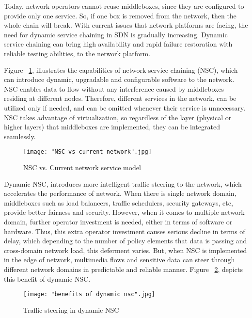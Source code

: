 \documentclass[english]{tktltiki2}
\theoremstyle{definition}
\theoremstyle{remark}
\begin{document}
{Today, network operators cannot reuse middleboxes, since they are configured to provide only one service. So, if one box is removed from the network, then the whole chain will break. With current issues that network platforms are facing,  the need for dynamic service chaining in SDN is gradually increasing. Dynamic service chaining can bring high availability and rapid failure restoration with reliable testing abilities, to the network platform. \cite{Wol13}

Figure ~\ref{fig:NSC}, illustrates the capabilities of network service chaining (NSC), which can introduce dynamic, upgradable and configurable software to the network. NSC enables data to flow without any interference caused by middleboxes residing at different nodes. Therefore, different services in the network, can be utilized only if needed, and can be omitted whenever their service is unnecessary. NSC takes advantage of virtualization, so regardless of the layer (physical or higher layers) that middleboxes are implemented, they can be integrated seamlessly. \cite{Wol13}
       
\begin{figure}[h!]
\centering
{}
\texttt{[image: "NSC vs current network".jpg]}
\caption{NSC vs. Current network service model \cite{Wol13}}
\label{fig:NSC}
\end{figure}

Dynamic NSC, introduces more intelligent traffic steering to the network, which accelerates the performance of network. When there is single network domain, middleboxes such as load balancers, traffic schedulers, security gateways, etc, provide better fairness and  security. However, when it comes to multiple network domain, further operator investment is needed, either in terms of software or hardware. Thus, this extra operator investment causes serious decline in terms of delay, which depending to the number of policy elements that data is passing and cross-domain network load, this deferment varies. But, when NSC is implemented in the edge of network, multimedia flows and sensitive data can steer through different network domains in predictable and reliable manner. Figure ~\ref{fig:NSCbenefit}, depicts this benefit of dynamic NSC. \cite{Wol13}


\begin{figure}[h!]
\centering
{}
\texttt{[image: "benefits of dynamic nsc".jpg]}
\caption{Traffic steering in dynamic NSC \cite{Wol13}}
\label{fig:NSCbenefit}
\end{figure}

}
\end{document}
